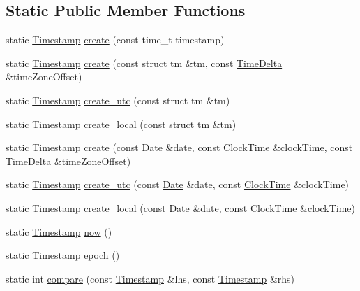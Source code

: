 \subsection*{\-Static \-Public \-Member \-Functions}
\begin{DoxyCompactItemize}
\item 
static \hyperlink{structTimestamp}{\-Timestamp} \hyperlink{structTimestamp_a050609c408bf55dafa24a080757a471b}{create} (const time\-\_\-t timestamp)
\item 
static \hyperlink{structTimestamp}{\-Timestamp} \hyperlink{structTimestamp_aa5ab499f6e8a649ba6a160593dce9600}{create} (const struct tm \&tm, const \hyperlink{structTimeDelta}{\-Time\-Delta} \&time\-Zone\-Offset)
\item 
static \hyperlink{structTimestamp}{\-Timestamp} \hyperlink{structTimestamp_ae1ec817a76d5f43941548b9cccf3bdeb}{create\-\_\-utc} (const struct tm \&tm)
\item 
static \hyperlink{structTimestamp}{\-Timestamp} \hyperlink{structTimestamp_ae2d7fea77bd2f2c7ca3343be080dd90f}{create\-\_\-local} (const struct tm \&tm)
\item 
static \hyperlink{structTimestamp}{\-Timestamp} \hyperlink{structTimestamp_a0585a5f7928f6bad9dda69eb5adf99ee}{create} (const \hyperlink{structDate}{\-Date} \&date, const \hyperlink{structClockTime}{\-Clock\-Time} \&clock\-Time, const \hyperlink{structTimeDelta}{\-Time\-Delta} \&time\-Zone\-Offset)
\item 
static \hyperlink{structTimestamp}{\-Timestamp} \hyperlink{structTimestamp_af18efc9b0db5803b00019e6e3f01895a}{create\-\_\-utc} (const \hyperlink{structDate}{\-Date} \&date, const \hyperlink{structClockTime}{\-Clock\-Time} \&clock\-Time)
\item 
static \hyperlink{structTimestamp}{\-Timestamp} \hyperlink{structTimestamp_acaa4f082d3a38dc42c8d815925add8a5}{create\-\_\-local} (const \hyperlink{structDate}{\-Date} \&date, const \hyperlink{structClockTime}{\-Clock\-Time} \&clock\-Time)
\item 
static \hyperlink{structTimestamp}{\-Timestamp} \hyperlink{structTimestamp_ab2b17140c0c966ad672395f3f90b8653}{now} ()
\item 
static \hyperlink{structTimestamp}{\-Timestamp} \hyperlink{structTimestamp_aa2f108710dbe1372d8fc7146a2e66c37}{epoch} ()
\item 
static int \hyperlink{structTimestamp_a64216c9061a4449c8d3fb9d1fecbb4a0}{compare} (const \hyperlink{structTimestamp}{\-Timestamp} \&lhs, const \hyperlink{structTimestamp}{\-Timestamp} \&rhs)
\end{DoxyCompactItemize}
